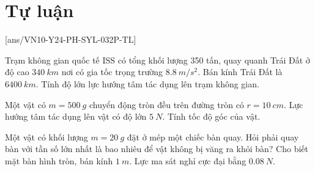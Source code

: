\section{Tự luận}
\setcounter{ex}{0}
[ans/VN10-Y24-PH-SYL-032P-TL]
\begin{ex}
	Trạm không gian quốc tế ISS có tổng khối lượng 350 tấn, quay quanh Trái Đất ở độ cao $\SI{340}{km}$ nơi có gia tốc trọng trường $\SI{8,8}{m/s^2}$. Bán kính Trái Đất là $\SI{6400}{km}$. Tính độ lớn lực hướng tâm tác dụng lên trạm không gian.
\end{ex}
\begin{ex}
	Một vật có $m = \SI{500}{g}$ chuyển động tròn đều trên đường tròn có $r = \SI{10}{cm}$. Lực hướng tâm tác dụng lên vật có độ lớn $\SI{5}{N}$. Tính tốc độ góc của vật.
\end{ex}
\begin{ex}
Một vật có khối lượng $m=\SI{20}{g}$ đặt ở mép một chiếc bàn quay. Hỏi phải quay bàn với tần số lớn nhất là bao nhiêu để vật không bị văng ra khỏi bàn? Cho biết mặt bàn hình tròn, bán kính $\SI{1}{m}$. Lực ma sát nghỉ cực đại bằng $\SI{0.08}{N}$.	
\end{ex}
